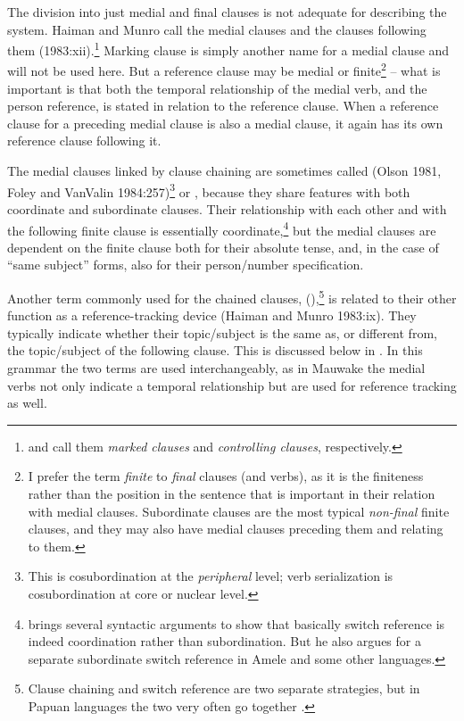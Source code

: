 The division into just medial and final clauses is not adequate for describing the system. Haiman and Munro call the medial clauses\textit{}  and the clauses following them  (1983:xii).\footnote{\citet{Comrie1983} and \citet{Roberts1997} call them \textit{marked clauses} and \textit{controlling clauses}, respectively.} Marking clause is simply another name for a medial clause and will not be used here. But a reference clause may be medial or finite\footnote{I prefer the term \textit{finite} to \textit{final} clauses (and verbs), as it is the finiteness rather than the position in the sentence that is important in their relation with medial clauses. Subordinate clauses are the most typical \textit{non-final} finite clauses, and they may also have medial clauses preceding them and relating to them.} -- what is important is that both the temporal relationship of the medial verb, and the person reference, is stated in relation to the reference clause. When a reference clause for a preceding medial clause is also a medial clause, it again has its own reference clause following it.

The medial clauses linked by clause chaining are sometimes called  (Olson 1981, Foley and VanValin 1984:257)\footnote{This is cosubordination at the \textit{peripheral} level; verb serialization is cosubordination at core or nuclear level.} or  \citep[177]{Foley1986}, because they share features with both coordinate and subordinate clauses. Their relationship with each other and with the following finite clause is essentially coordinate,\footnote{\citet{Roberts1988a} brings several syntactic arguments to show that basically switch reference is indeed coordination rather than subordination. But he also argues for a separate subordinate switch reference in Amele and some other languages.} but the medial clauses are dependent on the finite clause both for their absolute tense, and, in the case of ``same subject'' forms, also for their person/number specification. 

Another term commonly used for the chained clauses,  (),\footnote{Clause chaining and switch reference are two separate strategies, but in Papuan languages the two very often  go together \citep[104]{Roberts1997}.} is related to their other function as a reference-tracking device (Haiman and Munro 1983:ix). They typically indicate whether their topic/subject is the same as, or different from, the topic/subject of the following clause. This is discussed below in . In this grammar the two terms are used interchangeably, as in Mauwake the medial verbs not only indicate a temporal relationship but are used for reference tracking as well.

